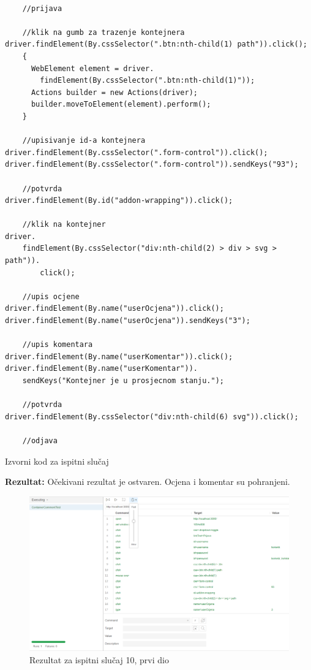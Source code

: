 \begin{verbatim}

    //prijava

    //klik na gumb za trazenje kontejnera
driver.findElement(By.cssSelector(".btn:nth-child(1) path")).click();
    {
      WebElement element = driver.
        findElement(By.cssSelector(".btn:nth-child(1)"));
      Actions builder = new Actions(driver);
      builder.moveToElement(element).perform();
    }
    
    //upisivanje id-a kontejnera
driver.findElement(By.cssSelector(".form-control")).click();
driver.findElement(By.cssSelector(".form-control")).sendKeys("93");
    
    //potvrda
driver.findElement(By.id("addon-wrapping")).click();

    //klik na kontejner
driver.
    findElement(By.cssSelector("div:nth-child(2) > div > svg > path")).
        click();
    
    //upis ocjene
driver.findElement(By.name("userOcjena")).click();
driver.findElement(By.name("userOcjena")).sendKeys("3");

    //upis komentara
driver.findElement(By.name("userKomentar")).click();
driver.findElement(By.name("userKomentar")).
    sendKeys("Kontejner je u prosjecnom stanju.");
    
    //potvrda
driver.findElement(By.cssSelector("div:nth-child(6) svg")).click();

    //odjava
\end{verbatim}
			\begin{listing}[H]

				\caption{Izvorni kod za ispitni slučaj \thetestcase}
				\label{test3}
			\end{listing}
			\noindent \textbf{Rezultat:} Očekivani rezultat je ostvaren. Ocjena i komentar su pohranjeni.
			
			\begin{figure}[H]
            					\includegraphics[width=\linewidth]{slike/selenium/containercomment.png}
            					\centering
            					\caption{Rezultat za ispitni slučaj 10, prvi dio}
            					\label{fig:test 10 p1}
            		            \end{figure}
			
